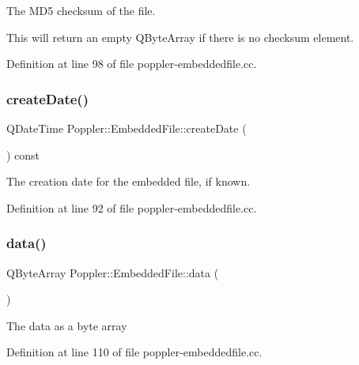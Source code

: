 The M\+D5 checksum of the file.

This will return an empty Q\+Byte\+Array if there is no checksum element. 

Definition at line 98 of file poppler-\/embeddedfile.\+cc.

\mbox{\label{class_poppler_1_1_embedded_file_aa82a829cfb9148f8596146021691d494}} 
\subsubsection{\texorpdfstring{create\+Date()}{createDate()}}
{\footnotesize\ttfamily Q\+Date\+Time Poppler\+::\+Embedded\+File\+::create\+Date (\begin{DoxyParamCaption}{ }\end{DoxyParamCaption}) const}

The creation date for the embedded file, if known. 

Definition at line 92 of file poppler-\/embeddedfile.\+cc.

\mbox{\label{class_poppler_1_1_embedded_file_ae72838cedd19245a261f27004d3c2c01}} 
\subsubsection{\texorpdfstring{data()}{data()}}
{\footnotesize\ttfamily Q\+Byte\+Array Poppler\+::\+Embedded\+File\+::data (\begin{DoxyParamCaption}{ }\end{DoxyParamCaption})}

The data as a byte array 

Definition at line 110 of file poppler-\/embeddedfile.\+cc.

\mbox{\label{class_poppler_1_1_embedded_file_a51afb8f38e7a53d4baf4d7573e46eec6}} 
